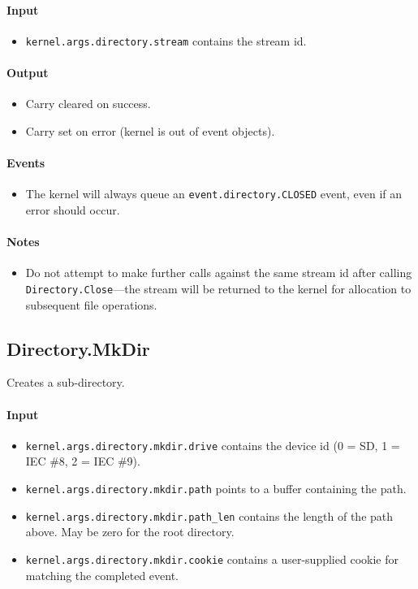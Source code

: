 \paragraph{Input} 
\begin{itemize}
\item \verb+kernel.args.directory.stream+ contains the stream id.
\end{itemize}

\paragraph{Output}
\begin{itemize}
\item Carry cleared on success.
\item Carry set on error (kernel is out of event objects).
\end{itemize}

\paragraph{Events}
\begin{itemize}
\item The kernel will always queue an \verb+event.directory.CLOSED+ event, even if an error should occur.
\end{itemize}

\paragraph{Notes}
\begin{itemize}
\item Do not attempt to make further calls against the same stream id after calling \verb+Directory.Close+---the stream will be returned to the kernel for allocation to subsequent file operations.
\end{itemize}


\subsection*{Directory.MkDir}
Creates a sub-directory.

\paragraph{Input}

\begin{itemize}
\item \verb+kernel.args.directory.mkdir.drive+ contains the device id (0 = SD, 1 = IEC \#8, 2 = IEC \#9).
\item \verb+kernel.args.directory.mkdir.path+ points to a buffer containing the path.
\item \verb+kernel.args.directory.mkdir.path_len+ contains the length of the path above.  May be zero for the root directory.
\item \verb+kernel.args.directory.mkdir.cookie+ contains a user-supplied cookie for matching the completed event.
\end{itemize}

